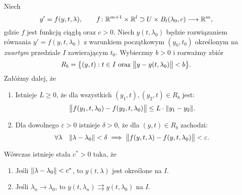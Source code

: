 
\begin{theorem}
  Niech
  \[
    y' = f(y,t,\lambda), \qquad
    f \colon \R^{m + 1} \times \R^l \supset U \times B_l(\lambda_0,c) \longrightarrow \R^m,
  \]
  gdzie $f$ jest funkcją ciągłą oraz $c > 0$. Niech $y(t,\lambda_0)$ będzie 
  rozwiązaniem równania $y' = f(y,t,\lambda_0)$ z warunkiem początkowym
  $(y_0, t_0)$ określonym na \emph{zwartym} przedziale $I$ zawierającym $t_0$. 
  Wybierzmy $b > 0$ i rozważmy zbiór 
  \[
    R_b = \big\{ (y,t) : t \in I \text{ oraz }
    \norm[\big]{ y - y(t,\lambda_0) } < b \big\}.
  \]
  Załóżmy dalej, że
  \begin{enumerate}
    \item Istnieje $L \geq 0$, że dla wszystkich $(y_1,t),(y_2,t) \in R_b$ jest:
    \[
      \norm[\big]{ f(y_1,t,\lambda_0) - f(y_2,t,\lambda_0) } \leq L \cdot 
      \norm{y_1 - y_2}.
    \]
    \item Dla dowolnego $\varepsilon > 0$ istnieje $\delta > 0$, że dla $(y,t) 
    \in R_b$ zachodzi:
    \[
      \forall \lambda \quad \norm{\lambda - \lambda_0} < \delta \implies 
      \norm[\big]{ f(y,t,\lambda) - f(y,t,\lambda_0) } < \varepsilon.
    \]
  \end{enumerate}
  Wówczas istnieje stała $c^{\ast} > 0$ taka, że
  \begin{enumerate}
    \item Jeśli $\norm{\lambda-\lambda_0} < c^{\ast}$, to $y(t,\lambda)$ jest 
    określone na $I$.
    \item Jeśli $\lambda_n \to \lambda_0$, to $y(t,\lambda_n) \rightrightarrows y(t,\lambda_0)$ na $I$.
  \end{enumerate}
\end{theorem}

